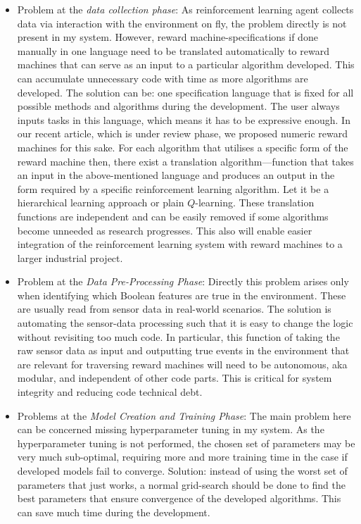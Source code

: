 \documentclass[a4paper,10pt]{article} %
\begin{document}
\begin{itemize}
\item Problem at the \emph{data collection phase}:
As reinforcement learning agent collects data via interaction with the environment on fly, the problem directly is not present in my system.
However, reward machine-specifications if done manually in one language need to be translated automatically to reward machines that can serve as an input to a particular algorithm developed.
This can accumulate unnecessary code with time as more algorithms are developed.
The solution can be: one specification language that is fixed for all possible methods and algorithms during the development.
The user always inputs tasks in this language, which means it has to be expressive enough.
In our recent article, which is under review phase, we proposed numeric reward machines for this sake.
For each algorithm that utilises a specific form of the reward machine then, there exist a translation algorithm---function that takes an input in the above-mentioned language and produces an output in the form required by a specific reinforcement learning algorithm.
Let it be a hierarchical learning approach or plain $Q$-learning.
These translation functions are independent and can be easily removed if some algorithms become unneeded as research progresses.
This also will enable easier integration of the reinforcement learning system with reward machines to a larger industrial project.
\item Problem at the \emph{Data Pre-Processing Phase}:
Directly this problem arises only when identifying which Boolean features are true in the environment.
These are usually read from sensor data in real-world scenarios.
The solution is automating the sensor-data processing such that it is easy to change the logic without revisiting too much code.
In particular, this function of taking the raw sensor data as input and outputting true events in the environment that are relevant for traversing reward machines will need to be autonomous, aka modular, and independent of other code parts.
This is critical for system integrity and reducing code technical debt.
\item Problems at the \emph{Model Creation and Training Phase}:
The main problem here can be concerned missing hyperparameter tuning in my system.
As the hyperparameter tuning is not performed, the chosen set of parameters may be very much sub-optimal, requiring more and more training time in the case if developed models fail to converge.
Solution: instead of using the worst set of parameters that just works, a normal grid-search should be done to find the best parameters that ensure convergence of the developed algorithms.
This can save much time during the development.
\end{itemize}
\end{document}
